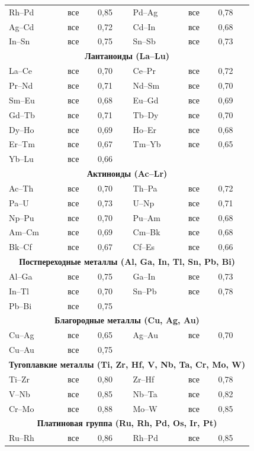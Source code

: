 \documentclass[12pt,a4paper]{article}
\begin{document}
\begin{longtable}{p{1.5cm}p{1.5cm}p{1.2cm}p{1.2cm}p{1.2cm}p{1.2cm}}
		Rh–Pd & все & 0,85 & Pd–Ag & все & 0,78 \\
		Ag–Cd & все & 0,72 & Cd–In & все & 0,68 \\
		In–Sn & все & 0,75 & Sn–Sb & все & 0,73 \\
		\multicolumn{6}{c}{\textbf{Лантаноиды (La–Lu)}} \\
		La–Ce & все & 0,70 & Ce–Pr & все & 0,72 \\
		Pr–Nd & все & 0,71 & Nd–Sm & все & 0,70 \\
		Sm–Eu & все & 0,68 & Eu–Gd & все & 0,69 \\
		Gd–Tb & все & 0,71 & Tb–Dy & все & 0,70 \\
		Dy–Ho & все & 0,69 & Ho–Er & все & 0,68 \\
		Er–Tm & все & 0,67 & Tm–Yb & все & 0,65 \\
		Yb–Lu & все & 0,66 & & & \\
		\multicolumn{6}{c}{\textbf{Актиноиды (Ac–Lr)}} \\
		Ac–Th & все & 0,70 & Th–Pa & все & 0,72 \\
		Pa–U  & все & 0,73 & U–Np & все & 0,71 \\
		Np–Pu & все & 0,70 & Pu–Am & все & 0,68 \\
		Am–Cm & все & 0,69 & Cm–Bk & все & 0,68 \\
		Bk–Cf & все & 0,67 & Cf–Es & все & 0,66 \\
		\multicolumn{6}{c}{\textbf{Постпереходные металлы (Al, Ga, In, Tl, Sn, Pb, Bi)}} \\
		Al–Ga & все & 0,75 & Ga–In & все & 0,73 \\
		In–Tl & все & 0,70 & Sn–Pb & все & 0,78 \\
		Pb–Bi & все & 0,75 & & & \\
		\multicolumn{6}{c}{\textbf{Благородные металлы (Cu, Ag, Au)}} \\
		Cu–Ag & все & 0,65 & Ag–Au & все & 0,70 \\
		Cu–Au & все & 0,75 & & & \\
		\multicolumn{6}{c}{\textbf{Тугоплавкие металлы (Ti, Zr, Hf, V, Nb, Ta, Cr, Mo, W)}} \\
		Ti–Zr & все & 0,80 & Zr–Hf & все & 0,78 \\
		V–Nb & все & 0,85 & Nb–Ta & все & 0,82 \\
		Cr–Mo & все & 0,88 & Mo–W & все & 0,85 \\
		\multicolumn{6}{c}{\textbf{Платиновая группа (Ru, Rh, Pd, Os, Ir, Pt)}} \\
		Ru–Rh & все & 0,86 & Rh–Pd & все & 0,85 \\

\end{longtable}
\end{document}
